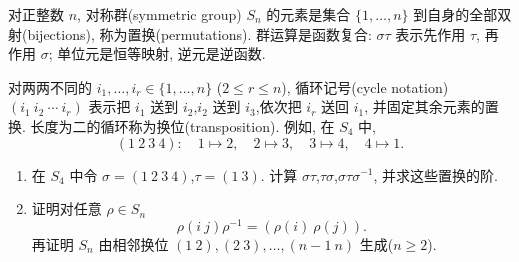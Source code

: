 \documentclass{article}
\begin{document}
\begin{problem}
  对正整数 $n$, 对称群(symmetric group) $S_n$ 的元素是集合 $\{1,\ldots,n\}$ 到自身的全部双射(bijections), 称为置换(permutations). 群运算是函数复合: $\sigma\tau$ 表示先作用 $\tau$, 再作用 $\sigma$; 单位元是恒等映射, 逆元是逆函数.

  对两两不同的 $i_1,\ldots,i_r\in\{1,\ldots,n\}$ ($2\leq r\leq n$), 循环记号(cycle notation) $(i_1\ i_2\ \cdots\ i_r)$ 表示把 $i_1$ 送到 $i_2$,$i_2$ 送到 $i_3$,依次把 $i_r$ 送回 $i_1$, 并固定其余元素的置换. 长度为二的循环称为换位(transposition). 例如, 在 $S_4$ 中,
  \[
    (1\ 2\ 3\ 4):\quad 1\mapsto2,\quad 2\mapsto3,\quad 3\mapsto4,\quad 4\mapsto1.
  \]
  \begin{enumerate}
    \item[(a)] 在 $S_4$ 中令 $\sigma=(1\ 2\ 3\ 4)$,$\tau=(1\ 3)$. 计算 $\sigma\tau$,$\tau\sigma$,$\sigma\tau\sigma^{-1}$, 并求这些置换的阶.
    \item[(b)] 证明对任意 $\rho\in S_n$
      \[
        \rho(i\ j)\rho^{-1}=(\rho(i)\ \rho(j)).
      \]
      再证明 $S_n$ 由相邻换位 $(1\ 2),(2\ 3),\ldots,(n-1\ n)$ 生成($n\geq2$).
  \end{enumerate}
\end{problem}
\end{document}
